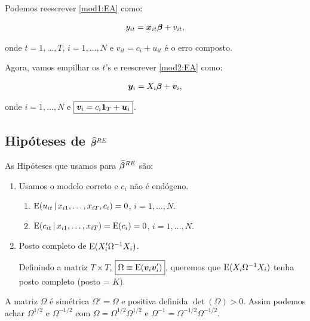 \documentclass[11pt, oneside, a4paper, article]{article}
\numberwithin{equation}{section}
\begin{document}
\begin{description}
\begin{description}
Podemos reescrever \eqref{mod1:EA} como:

\vspace{-1 em}
\begin{align} \label{mod2:EA}
	y_{it} = \boldsymbol{x}_{it} \boldsymbol{\beta} + v_{it},
\end{align}

\noindent
onde
$t = 1, \dots, T$, $i = 1, \dots, N$ e $\boxed{v_{it} = c_{i} + u_{it}}$ é o erro composto.

Agora, vamos empilhar os $t$'s e reescrever \eqref{mod2:EA} como:

\vspace{-1 em}
\begin{align} \label{mod3:EA}
	\boldsymbol{y}_{i} = X_{i} \boldsymbol{\beta} + \boldsymbol{v}_{i},
\end{align}

\noindent
onde
$i = 1, \dots, N$ e $\boxed{\boldsymbol{v}_{i} = c_{i} \boldsymbol{1}_{T} + \boldsymbol{u}_{i}}$.

\subsection*{Hipóteses de $\boldsymbol{\widehat{\beta}}^{RE}$}

As Hipóteses que usamos para $\boldsymbol{\widehat{\beta}}^{RE}$ são:

\begin{enumerate} \itemsep0pt
\item  
Usamos o modelo correto e $c_{i}$ não é endógeno.

\begin{enumerate}[label =\alph*)]
\item 
	$\text{E}( u_{it} \, | \,  x_{i1}, \dots, x_{iT}, c_{i} ) = 0$,
	$i = 1, \dots, N$.
\item        
	$\text{E}( c_{it} \, | \, x_{i1}, \dots, x_{iT} ) = \text{E}( c_{i} ) = 0$,
	$i = 1, \dots, N$.
\end{enumerate}

\item  Posto completo de $\text{E}( X_{i}' \Omega^{-1} X_{i} )$.

Definindo a matriz $T \times T$, $\boxed{\Omega \equiv \text{E}(\boldsymbol{v}_{i} \boldsymbol{v}_{i}')}$, queremos que $\text{E}( X_{i} \Omega^{-1} X_{i} )$ tenha posto completo (posto = $K$).
\end{enumerate}

A matriz $\Omega$ é simétrica $\Omega' = \Omega$ e positiva definida $\det(\Omega) > 0$.
Assim podemos achar $\Omega^{1/2}$ e $\Omega^{-1/2}$ com $\Omega = \Omega^{1/2} \Omega^{1/2}$ e $\Omega^{-1} = \Omega^{-1/2} \Omega^{-1/2}$.


\end{description}
\end{description}
\end{document}
